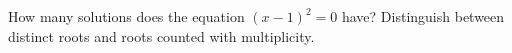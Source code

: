 How many solutions does the equation $(x-1)^2=0$ have? Distinguish between distinct roots and roots counted with multiplicity.
